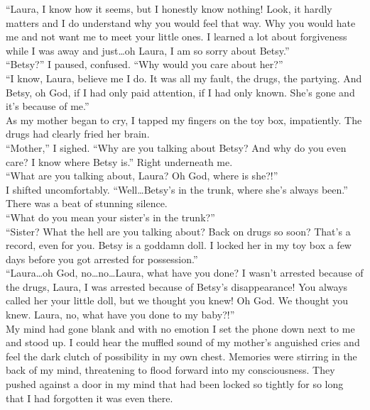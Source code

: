 \documentclass[a5paper]{scrartcl}
\begin{document}
\enquote{Laura, I know how it seems, but I honestly know nothing! Look, it hardly matters and I do understand why you would feel that way. Why you would hate me and not want me to meet your little ones. I learned a lot about forgiveness while I was away and just\dots oh Laura, I am so sorry about Betsy.}\\

\enquote{Betsy?} I paused, confused. \enquote{Why would you care about her?}\\

\enquote{I know, Laura, believe me I do. It was all my fault, the drugs, the partying. And Betsy, oh God, if I had only paid attention, if I had only known. She's gone and it's because of me.}\\

As my mother began to cry, I tapped my fingers on the toy box, impatiently. The drugs had clearly fried her brain.\\

\enquote{Mother,} I sighed. \enquote{Why are you talking about Betsy? And why do you even care? I know where Betsy is.} Right underneath me.\\

\enquote{What are you talking about, Laura? Oh God, where is she?!}\\

I shifted uncomfortably. \enquote{Well\dots Betsy's in the trunk, where she's always been.}\\

There was a beat of stunning silence.\\

\enquote{What do you mean your sister's in the trunk?}\\

\enquote{Sister? What the hell are you talking about? Back on drugs so soon? 
That's a record, even for you. Betsy is a goddamn doll. I locked her in my toy box a few days before you got arrested for possession.}\\

\enquote{Laura\dots oh God, no\dots no\dots Laura, what have you done? I wasn't arrested because of the drugs, Laura, I was arrested because of Betsy's disappearance! You always called her your little doll, but we thought you knew! Oh God. We thought you knew. Laura, no, what have you done to my baby?!}\\

My mind had gone blank and with no emotion I set the phone down next to me and stood up. I could hear the muffled sound of my mother's anguished cries and feel the dark clutch of possibility in my own chest. Memories were stirring in the back of my mind, threatening to flood forward into my consciousness. They pushed against a door in my mind that had been locked so tightly for so long that I had forgotten it was even there.\\
\end{document}

